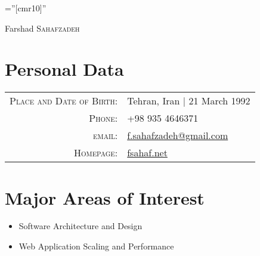 \documentclass[a4paper,10pt]{article}
\begin{document}

\pagestyle{empty} %

\font\fb=''[cmr10]'' %

\par{\centering
		{\Huge Farshad \textsc{Sahafzadeh}
	}\bigskip\par}

\section{Personal Data}

\begin{tabular}{rl}
    \textsc{Place and Date of Birth:} & Tehran, Iran  | 21 March 1992 \\
    \textsc{Phone:}     & +98 935 4646371\\
    \textsc{email:}     & \href{mailto:f.sahafzadeh@gmail.com}{f.sahafzadeh@gmail.com}\\
    \textsc{Homepage:}     & \href{http://fsahaf.net}{fsahaf.net}
\end{tabular}

\section{Major Areas of Interest}
\begin{itemize}
  \item Software Architecture and Design
  \item Web Application Scaling and Performance
\end{itemize}

\end{document}
